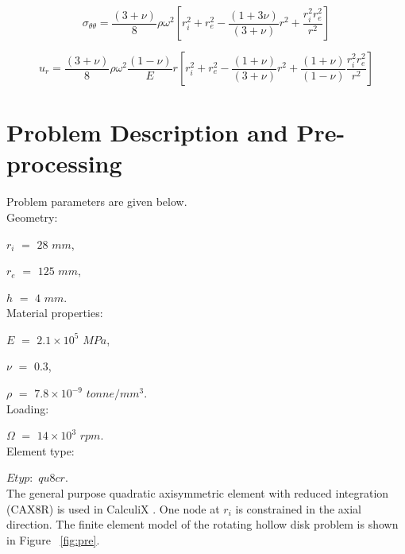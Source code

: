\documentclass[12pt, a4paper, twoside]{article}
\begin{document}
\begin{equation}
\label{equation:sigma_tt}
{{\sigma }_{{\theta }{\theta }}={\frac {(3+{\nu })} {8}}{\rho }{{\omega }^{2}}\left [ {{{r}^{2}_{i}}+{{r}^{2}_{e}}-\frac {(1+3{\nu })} {(3+{\nu })}{{r}^{2}}+{\frac {{{r}^{2}_{i}}{{r}^{2}_{e}}} {{r}^{2}}}} \right ]}
\end{equation}

\begin{equation}
\label{equation:u_r}
{{u}_{r}={\frac {(3+{\nu })} {8}}{\rho }{{\omega }^{2}}{\frac {(1-{\nu })} {E}r}\left [ {{{r}^{2}_{i}}+{{r}^{2}_{e}}-\frac {(1+{\nu })} {(3+{\nu })}{{r}^{2}}+{\frac {(1+{\nu })} {(1-{\nu })}\frac {{{r}^{2}_{i}}{{r}^{2}_{e}}} {{r}^{2}}}} \right ]}
\end{equation}

\clearpage
\section{Problem Description and Pre-processing}
Problem parameters are given below.\\


Geometry:

$r_i$ $=$ $28$ $mm$,

$r_e$ $=$ $125$ $mm$,

$h$ $=$ $4$ $mm$.\\



Material properties:

$E$ $=$ $2.1 \times 10^{5}$ $MPa$,

$\nu$ $=$ $0.3$,

$\rho$ $=$ $7.8 \times 10^{-9}$  $tonne/mm^{3}$.\\

Loading:

$\Omega$ $=$ $14 \times 10^{3}$ $rpm$.\\

Element type:

$Etyp:$ $qu8cr$.\\

The general purpose quadratic axisymmetric element with reduced integration (CAX8R) is used in CalculiX \cite{CalculiX_website}. One node at $r_i$ is constrained in the axial direction. The finite element model of the rotating hollow disk problem is shown in Figure ~\ref{fig:pre}.
\end{document}
